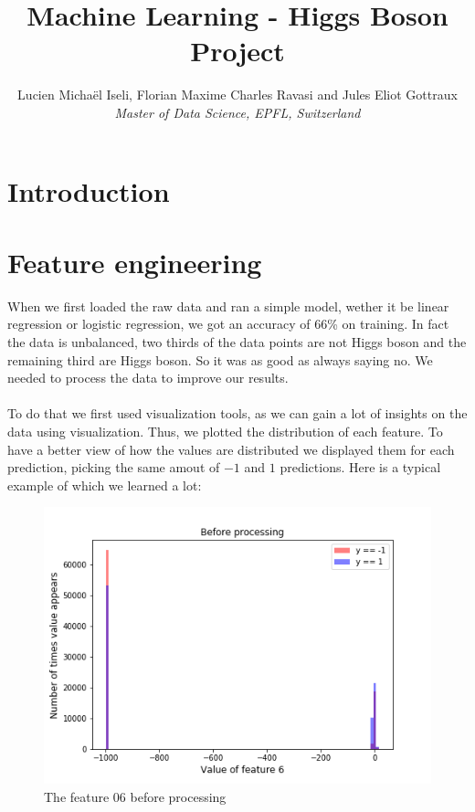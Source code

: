 \documentclass[10pt,conference,compsocconf]{IEEEtran}
\begin{document}
\title{Machine Learning - Higgs Boson Project}

\author{
  Lucien Michaël Iseli, Florian Maxime Charles Ravasi and Jules Eliot Gottraux\\
  \textit{Master of Data Science, EPFL, Switzerland}
}

\maketitle

\section{Introduction}

\section{Feature engineering}
When we first loaded the raw data and ran a simple model, wether it be linear regression or logistic regression, we got an accuracy of 66\% on training. In fact the data is unbalanced, two thirds of the data points are not Higgs boson and the remaining third are Higgs boson. So it was as good as always saying no. We needed to process the data to improve our results. \\\\
To do that we first used visualization tools, as we can gain a lot of insights on the data using visualization. Thus, we plotted the distribution of each feature. To have a better view of how the values are distributed we displayed them for each prediction, picking the same amout of $-1$ and $1$ predictions. Here is a typical example of which we learned a lot:
\begin{figure}[h!]
  \centering
  \includegraphics[width=\columnwidth]{graph-features/feature-06-raw.png}
  \caption{The feature 06 before processing}
	\label{fig:feature-06-raw}
\end{figure} \\
\end{document}
